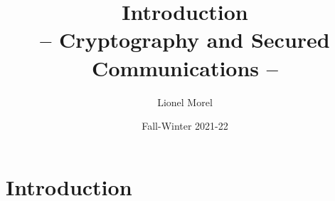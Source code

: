 \documentclass[
hyperref={pdfpagelabels=false}
,xcolor=table
]
{beamer}
\title[CSC - Intro]{Introduction \\ -- Cryptography and Secured Communications --}
\author[]{Lionel Morel}
\institute[]{Telecommunications - INSA Lyon}
\date{Fall-Winter 2021-22}
\begin{document}
\begin{frame}
  \maketitle
\end{frame}





\section{Introduction}
\end{document}

